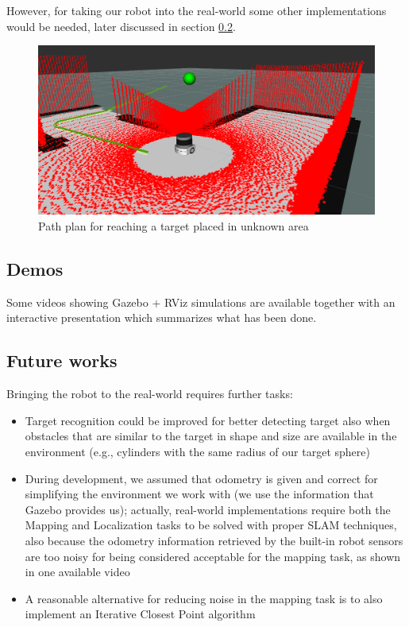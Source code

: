 \documentclass[9pt,conference]{IEEEtran}
\begin{document}
However, for taking our robot into the real-world some other implementations would be needed, later discussed in section \ref{sec:future-works}.

\begin{figure}[h!]
    \centering
    \includegraphics[width=1\linewidth]{images/presentation-cover.png}
    \caption{Path plan for reaching a target placed in unknown area}
    \label{fig:target-in-unknown-area}
\end{figure}


\subsection{Demos}

Some videos \cite{demo-videos} showing Gazebo + RViz simulations are available together with an interactive presentation \cite{demo-presentation} which summarizes what has been done. 


\subsection{Future works}
\label{sec:future-works}

Bringing the robot to the real-world requires further tasks:

\begin{itemize}
    \item Target recognition could be improved for better detecting target also when obstacles that are similar to the target in shape and size are available in the environment (e.g., cylinders with the same radius of our target sphere)
    \item During development, we assumed that odometry is given and correct for simplifying the environment we work with (we use the information that Gazebo provides us); actually, real-world implementations require both the Mapping and Localization tasks to be solved with proper SLAM techniques, also because the odometry information retrieved by the built-in robot sensors are too noisy for being considered acceptable for the mapping task, as shown in one available video \cite{demo-error-odom}
    \item A reasonable alternative for reducing noise in the mapping task is to also implement an Iterative Closest Point algorithm \cite{wiki-icp}
\end{itemize}
\end{document}
